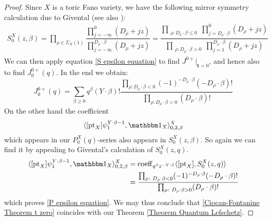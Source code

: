 \begin{proof}
Since $X$ is a toric Fano variety, we have the following mirror symmetry calculation due to Givental \cite{Givental-equivariantGW} (see also \cite[Definition 7.2.8]{CF-K}):
\begin{align*}
S_0^X(z,\beta) =\prod_{\rho\in\Sigma_X(1)}\dfrac{\prod_{j=-\infty}^0(D_{\rho}+jz)}{\prod_{j=-\infty}^{D_{\rho}\cdot \beta}(D_\rho+jz)}
=\dfrac{\prod_{\substack{\rho \colon D_\rho \cdot \beta\leq 0}} \prod_{j=D_\rho \cdot \beta}^0 (D_{\rho}+jz)}{\prod_{\substack{\rho\colon D_\rho \cdot\beta > 0}} \prod_{j=1}^{D_\rho\cdot\beta} (D_{\rho}+jz)}
\end{align*}
We can then apply equation \eqref{S epsilon equation} to find $J^{0+}|_{\mathbf{t}=0}$, and hence also to find $J^{0+}_0(q)$. In the end we obtain:
\begin{equation*}
 J^{0+}_0(q)=\sum_{\beta\geq 0}q^\beta(Y\cdot\beta)!\frac{\prod_{\rho\colon D_\rho\cdot\beta< 0}(-1)^{-D_{\rho}\cdot\beta}(-D_{\rho}\cdot\beta)!}{\prod_{\rho\colon D_\rho\cdot\beta> 0}(D_{\rho}\cdot\beta)!}
\end{equation*}
On the other hand the coefficient
\begin{equation*} \langle[\pt_X]\psi_1^{Y\cdot\beta-1},\mathbbm 1_X\rangle_{0,2,\beta}^X\end{equation*}
which appears in our $P_0^X(q)$-series also appears in $S_0^X(z,\beta)$. So again we can find it by appealing to Givental's calculation of $S_0^X(z,q)$.
\begin{align*}
 \langle[\pt_X]\psi_1^{Y\cdot\beta-1},\mathbbm 1_X\rangle_{0,2,\beta}^X &=\operatorname{coeff}_{q^\beta z^{-Y\cdot\beta}}\langle [\pt_X],S_0^X(z,q) \rangle\\
& =\frac{\prod_{\rho\colon D_\rho\cdot\beta< 0}(-1)^{-D_{\rho}\cdot\beta}(-D_{\rho}\cdot\beta)!}{\prod_{\rho\colon D_\rho\cdot\beta> 0}(D_{\rho}\cdot\beta)!}
\end{align*}
which proves \eqref{P epsilon equation}. We may thus conclude that \eqref{Ciocan-Fontanine Theorem t zero} coincides with our Theorem \ref{Theorem Quantum Lefschetz}. \end{proof}